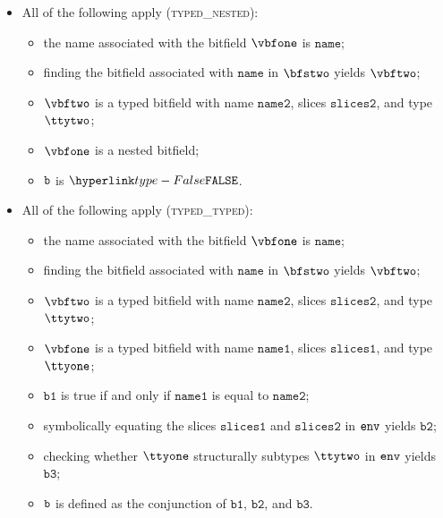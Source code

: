 \documentclass{book}
\newcommand\vbone[0]{\texttt{b1}}
\newcommand\vbtwo[0]{\texttt{b2}}
\newcommand\vbthree[0]{\texttt{b3}}
\newcommand\nameone[0]{\texttt{name1}}
\newcommand\nametwo[0]{\texttt{name2}}
\newcommand\slicesone[0]{\texttt{slices1}}
\newcommand\slicestwo[0]{\texttt{slices2}}
\newcommand\name[0]{\texttt{name}}
\begin{document}
\begin{itemize}
  \item All of the following apply (\textsc{typed\_nested}):
  \begin{itemize}
    \item the name associated with the bitfield $\vbfone$ is $\name$;
    \item finding the bitfield associated with $\name$ in $\bfstwo$ yields $\vbftwo$;
    \item $\vbftwo$ is a typed bitfield with name $\nametwo$, slices $\slicestwo$, and type $\ttytwo$;
    \item $\vbfone$ is a nested bitfield;
    \item $\texttt{b}$ is $\False$.
  \end{itemize}

  \item All of the following apply (\textsc{typed\_typed}):
  \begin{itemize}
    \item the name associated with the bitfield $\vbfone$ is $\name$;
    \item finding the bitfield associated with $\name$ in $\bfstwo$ yields $\vbftwo$;
    \item $\vbftwo$ is a typed bitfield with name $\nametwo$, slices $\slicestwo$, and type $\ttytwo$;
    \item $\vbfone$ is a typed bitfield with name $\nameone$, slices $\slicesone$, and type $\ttyone$;
    \item $\vbone$ is true if and only if $\nameone$ is equal to $\nametwo$;
    \item symbolically equating the slices $\slicesone$ and $\slicestwo$ in $\texttt{env}$ yields $\vbtwo$;
    \item checking whether $\ttyone$ structurally subtypes $\ttytwo$ in $\texttt{env}$ yields $\vbthree$;
    \item $\texttt{b}$ is defined as the conjunction of $\vbone$, $\vbtwo$, and $\vbthree$.
  \end{itemize}
\end{itemize}
\end{document}
